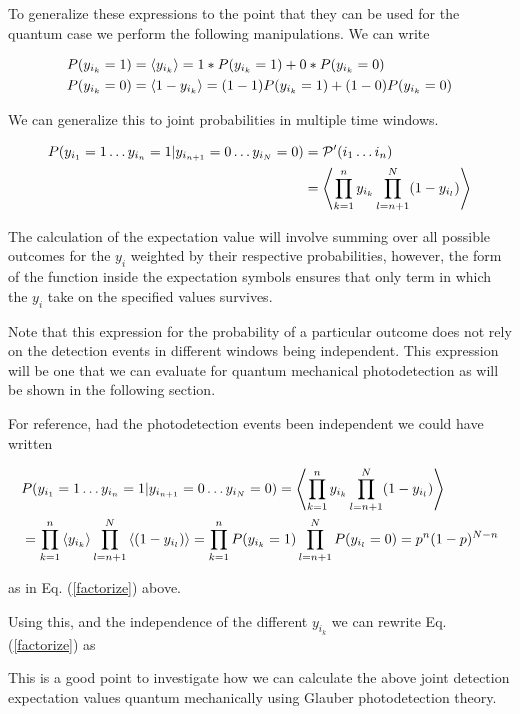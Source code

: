 \documentclass[12pt]{article}
\begin{document}
To generalize these expressions to the point that they can be used for the quantum case we perform the following manipulations. We can write

\begin{align}
P(y_{i_k} = 1) &= \Braket{y_{i_k}} = 1*P(y_{i_k}=1) + 0*P(y_{i_k}=0)\\
P(y_{i_k} = 0) &= \Braket{1-y_{i_k}} = (1-1)P(y_{i_k}=1) + (1-0)P(y_{i_k}=0)
\end{align}

We can generalize this to joint probabilities in multiple time windows.

\begin{align}
P(y_{i_1}=1 \ldots y_{i_n}=1 | y_{i_{n+1}}=0 \ldots y_{i_N}=0) &= \mathcal{P}'(i_1 \ldots i_n)\\
&= \Braket{\prod_{k=1}^n y_{i_k} \prod_{l=n+1}^{N} (1-y_{i_l})} \label{Pprime}
\end{align}

The calculation of the expectation value will involve summing over all possible outcomes for the $y_i$ weighted by their respective probabilities, however, the form of the function inside the expectation symbols ensures that only term in which the $y_i$ take on the specified values survives.

Note that this expression for the probability of a particular outcome does not rely on the detection events in different windows being independent. This expression will be one that we can evaluate for quantum mechanical photodetection as will be shown in the following section.

For reference, had the photodetection events been independent we could have written

\begin{align}
&P(y_{i_1}=1 \ldots y_{i_n}=1 | y_{i_{n+1}}=0 \ldots y_{i_N}=0) = \Braket{\prod_{k=1}^n y_{i_k} \prod_{l=n+1}^{N} (1-y_{i_l})}\\
&= \prod_{k=1}^n \Braket{y_{i_k}} \prod_{l=n+1}^{N} \Braket{(1-y_{i_l})} = \prod_{k=1}^n P(y_{i_k}=1) \prod_{l=n+1}^{N} P({y_{i_l}}=0) = p^n (1-p)^{N-n}
\end{align}


as in Eq. (\ref{factorize}) above.

Using this, and the independence of the different $y_{i_k}$ we can rewrite Eq. (\ref{factorize}) as

This is a good point to investigate how we can calculate the above joint detection expectation values quantum mechanically using Glauber photodetection theory.
\end{document}
